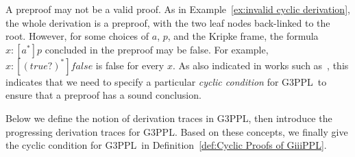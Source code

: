 \documentclass[manuscript,screen]{acmart}
\newcommand{\true}[0]{\mathit{true}}
\newcommand{\false}[0]{\mathit{false}}
\newcommand{\GiiiPPL}[0]{\mbox{G3PPL}}
\begin{document}
A preproof may not be a valid proof. 
As in Example~\ref{ex:invalid cyclic derivation}, the whole derivation is a preproof, with the two leaf nodes back-linked to the root. However, for some choices of $a$, $p$, and the Kripke frame, the formula $x : [a^*]p$ concluded in the preproof may be false. For example, $x : [(\true?)^*]\false$ is false for every $x$. 
As also indicated in works such as~\cite{Brotherston07,Brotherston08}, this indicates that we need to specify a particular \emph{cyclic condition} for \GiiiPPL\ to ensure that a preproof has a sound conclusion. 


Below we define the notion of derivation traces in \GiiiPPL, then introduce the progressing derivation traces for \GiiiPPL. Based on these concepts, we finally give the cyclic condition for \GiiiPPL\ in Definition~\ref{def:Cyclic Proofs of GiiiPPL}. 
\end{document}
